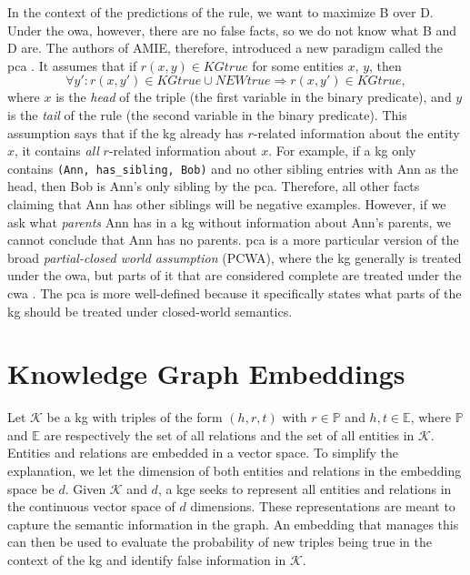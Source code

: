 In the context of the predictions of the rule, we want to maximize B over D. Under the \gls{owa}, however, there are no false facts, so we do not know what B and D are. The authors of AMIE, therefore, introduced a new paradigm called the \gls{pca} \cite{amie}. It assumes that if $r(x, y) \in KG true$ for some entities $x$, $y$, then
\[\forall y' : r(x, y') \in KGtrue \cup NEWtrue \Rightarrow r(x, y') \in KGtrue,\]
where $x$ is the \textit{head} of the triple (the first variable in the binary predicate), and $y$ is the \textit{tail} of the rule (the second variable in the binary predicate).
This assumption says that if the \gls{kg} already has $r$-related information about the entity $x$, it contains \textit{all} $r$-related information about $x$. For example, if a \gls{kg} only contains \texttt{(Ann, has\_sibling, Bob)} and no other sibling entries with Ann as the head, then Bob is Ann's only sibling by the \gls{pca}. Therefore, all other facts claiming that Ann has other siblings will be negative examples. However, if we ask what \textit{parents} Ann has in a \gls{kg} without information about Ann's parents, we cannot conclude that Ann has no parents. \gls{pca} is a more particular version of the broad \textit{partial-closed world assumption} (PCWA), where the \gls{kg} generally is treated under the \gls{owa}, but parts of it that are considered complete are treated under the \gls{cwa} \cite{motro1989integrity}. The \gls{pca} is more well-defined because it specifically states what parts of the \gls{kg} should be treated under closed-world semantics.

\section{Knowledge Graph Embeddings}
\label{KG_embeddings}
Let $\mathcal{K}$ be a \gls{kg} with triples of the form $(h, r, t)$ with $r\in \mathbb{P}$ and $h, t \in \mathbb{E}$, where $\mathbb{P}$ and $\mathbb{E}$ are respectively the set of all relations and the set of all entities in $\mathcal{K}$. Entities and relations are embedded in a vector space. To simplify the explanation, we let the dimension of both entities and relations in the embedding space be $d$.
Given $\mathcal{K}$ and $d$, a \gls{kge} seeks to represent all entities and relations in the continuous vector space of $d$ dimensions. These representations are meant to capture the semantic information in the graph. An embedding that manages this can then be used to evaluate the probability of new triples being true in the context of the \gls{kg} and identify false information in $\mathcal{K}$.%


